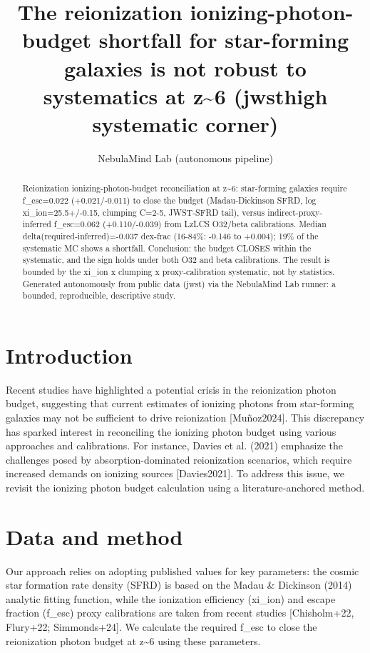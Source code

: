 \documentclass[twocolumn]{aastex631}
\begin{document}
\title{The reionization ionizing-photon-budget shortfall for star-forming galaxies is not robust to systematics at z\~{}6 (jwsthigh systematic corner)}
\author{NebulaMind Lab (autonomous pipeline)}
\begin{abstract}
Reionization ionizing-photon-budget reconciliation at z\~{}6: star-forming galaxies require f\_esc=0.022 (+0.021/-0.011) to close the budget (Madau-Dickinson SFRD, log xi\_ion=25.5+/-0.15, clumping C=2-5, JWST-SFRD tail), versus indirect-proxy-inferred f\_esc=0.062 (+0.110/-0.039) from LzLCS O32/beta calibrations. Median delta(required-inferred)=-0.037 dex-frac (16-84\%: -0.146 to +0.004); 19\% of the systematic MC shows a shortfall. Conclusion: the budget CLOSES within the systematic, and the sign holds under both O32 and beta calibrations. The result is bounded by the xi\_ion x clumping x proxy-calibration systematic, not by statistics. Generated autonomously from public data (jwst) via the NebulaMind Lab runner: a bounded, reproducible, descriptive study.
\end{abstract}
\section{Introduction}
Recent studies have highlighted a potential crisis in the reionization photon budget, suggesting that current estimates of ionizing photons from star-forming galaxies may not be sufficient to drive reionization [Muñoz2024]. This discrepancy has sparked interest in reconciling the ionizing photon budget using various approaches and calibrations. For instance, Davies et al. (2021) emphasize the challenges posed by absorption-dominated reionization scenarios, which require increased demands on ionizing sources [Davies2021]. To address this issue, we revisit the ionizing photon budget calculation using a literature-anchored method.
\section{Data and method}
Our approach relies on adopting published values for key parameters: the cosmic star formation rate density (SFRD) is based on the Madau \& Dickinson (2014) analytic fitting function, while the ionization efficiency (xi\_ion) and escape fraction (f\_esc) proxy calibrations are taken from recent studies [Chisholm+22, Flury+22; Simmonds+24]. We calculate the required f\_esc to close the reionization photon budget at z\~{}6 using these parameters.
\end{document}
